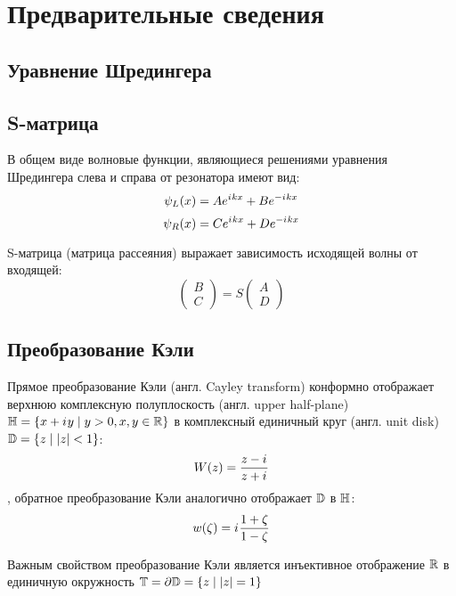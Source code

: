 \chapter{Предварительные сведения}
\label{chapter1}

\section{Уравнение Шредингера}


\section{S-матрица}


В общем виде волновые функции, являющиеся решениями уравнения Шредингера слева и справа от резонатора имеют вид:
\[
\psi_L(x) = A e^{{i\mkern1mu} k x} + B e^{-{i\mkern1mu} k x}
\]
\[
\psi_R(x) = C e^{{i\mkern1mu} k x} + D e^{-{i\mkern1mu} k x}
\]

S-матрица (матрица рассеяния) выражает зависимость исходящей волны от входящей:
\[
\begin{pmatrix} B \\ C \end{pmatrix} = S \begin{pmatrix} A \\ D \end{pmatrix}
\]



\section{Преобразование Кэли}

Прямое преобразование Кэли (англ. Cayley transform) конформно отображает верхнюю комплексную полуплоскость (англ. upper half-plane) $\mathbb{H} = \{ x + {i\mkern1mu} y \mid y > 0, x, y \in \mathbb{R} \}$ в комплексный единичный круг (англ. unit disk) $\mathbb{D} = \{ z \mid \abs{z} < 1 \}$:
\begin{equation}\label{eq:cayley}
W(z) = \frac{z - {i\mkern1mu}}{z + {i\mkern1mu}}
\end{equation}
, обратное преобразование Кэли аналогично отображает $\mathbb{D}$ в $\mathbb{H}$:
\[
w(\zeta) = {i\mkern1mu} \frac{1 + \zeta}{1 - \zeta}
\]

Важным свойством преобразование Кэли является инъективное отображение $\mathbb{R}$ в единичную окружность $\mathbb{T} = \partial \mathbb{D} =  \{z \mid \abs{z} = 1 \}$

